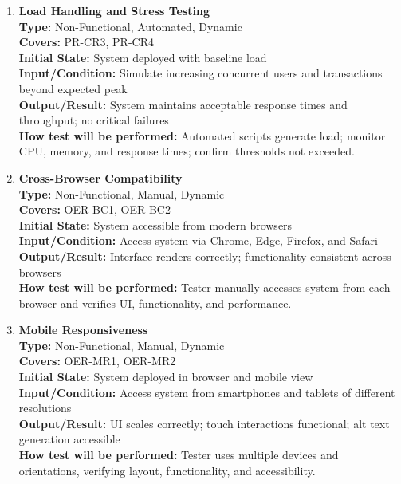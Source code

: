 \documentclass[12pt, titlepage]{article}
\begin{document}
\begin{enumerate}[label=NFR-ST \arabic*., wide=0pt, leftmargin=*]
  \item \textbf{Load Handling and Stress Testing} \\[2mm]
    \textbf{Type:} Non-Functional, Automated, Dynamic \\
    \textbf{Covers:} PR-CR3, PR-CR4 \\
    \textbf{Initial State:} System deployed with baseline load \\
    \textbf{Input/Condition:} Simulate increasing concurrent users
    and transactions beyond expected peak \\
    \textbf{Output/Result:} System maintains acceptable response
    times and throughput; no critical failures \\[2mm]
    \textbf{How test will be performed:} Automated scripts generate
    load; monitor CPU, memory, and response times; confirm thresholds
    not exceeded.

  \item \textbf{Cross-Browser Compatibility} \\[2mm]
    \textbf{Type:} Non-Functional, Manual, Dynamic \\
    \textbf{Covers:} OER-BC1, OER-BC2 \\
    \textbf{Initial State:} System accessible from modern browsers \\
    \textbf{Input/Condition:} Access system via Chrome, Edge,
    Firefox, and Safari \\
    \textbf{Output/Result:} Interface renders correctly;
    functionality consistent across browsers \\[2mm]
    \textbf{How test will be performed:} Tester manually accesses
    system from each browser and verifies UI, functionality, and performance.

  \item \textbf{Mobile Responsiveness} \\[2mm]
    \textbf{Type:} Non-Functional, Manual, Dynamic \\
    \textbf{Covers:} OER-MR1, OER-MR2 \\
    \textbf{Initial State:} System deployed in browser and mobile view \\
    \textbf{Input/Condition:} Access system from smartphones and
    tablets of different resolutions \\
    \textbf{Output/Result:} UI scales correctly; touch interactions
    functional; alt text generation accessible \\[2mm]
    \textbf{How test will be performed:} Tester uses multiple devices
    and orientations, verifying layout, functionality, and accessibility.


\end{enumerate}
\end{document}

